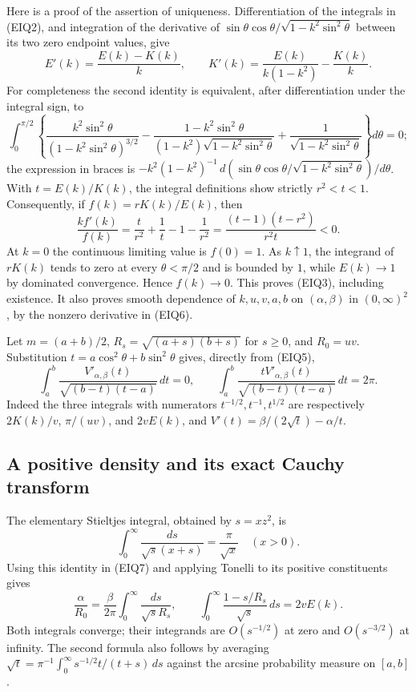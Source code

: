 Here is a proof of the assertion of uniqueness. Differentiation of the
integrals in (EIQ2), and integration of the derivative of
$\sin\theta\cos\theta/\sqrt{1-k^2\sin^2\theta}$ between its two zero
endpoint values, give
\[
 E'(k)=\frac{E(k)-K(k)}{k},\qquad
 K'(k)=\frac{E(k)}{k(1-k^2)}-\frac{K(k)}{k}.
\]
For completeness the second identity is equivalent, after differentiation
under the integral sign, to
\[
 \int_0^{\pi/2}
 \left\{\frac{k^2\sin^2\theta}{(1-k^2\sin^2\theta)^{3/2}}
 -\frac{1-k^2\sin^2\theta}{(1-k^2)\sqrt{1-k^2\sin^2\theta}}
 +\frac1{\sqrt{1-k^2\sin^2\theta}}\right\}d\theta=0;
\]
the expression in braces is
$-k^2(1-k^2)^{-1}\,d(\sin\theta\cos\theta/
\sqrt{1-k^2\sin^2\theta})/d\theta$.
With $t=E(k)/K(k)$, the integral definitions show strictly
$r^2<t<1$.  Consequently, if $f(k)=rK(k)/E(k)$, then
\begin{equation}\tag{EIQ6}
 \frac{kf'(k)}{f(k)}
 =\frac{t}{r^2}+\frac1t-1-\frac1{r^2}
 =\frac{(t-1)(t-r^2)}{r^2t}<0.
\end{equation}
At $k=0$ the continuous limiting value is $f(0)=1$.
As $k\uparrow1$, the integrand of $rK(k)$ tends to zero at every
$\theta<\pi/2$ and is bounded by $1$, while $E(k)\to1$ by dominated
convergence.  Hence $f(k)\to0$.  This proves (EIQ3), including existence.
It also proves smooth dependence of $k,u,v,a,b$ on $(\alpha,\beta)$ in
$(0,\infty)^2$, by the nonzero derivative in (EIQ6).

Let $m=(a+b)/2$, $R_s=\sqrt{(a+s)(b+s)}$ for $s\geq0$, and
$R_0=uv$.  Substitution
$t=a\cos^2\theta+b\sin^2\theta$ gives, directly from (EIQ5),
\begin{equation}\tag{EIQ7}
 \int_a^b\frac{V'_{\alpha,\beta}(t)}
                  {\sqrt{(b-t)(t-a)}}\,dt=0,
 \qquad
 \int_a^b\frac{tV'_{\alpha,\beta}(t)}
                  {\sqrt{(b-t)(t-a)}}\,dt=2\pi.
\end{equation}
Indeed the three integrals with numerators $t^{-1/2},t^{-1},t^{1/2}$
are respectively $2K(k)/v$, $\pi/(uv)$, and $2vE(k)$, and
$V'(t)=\beta/(2\sqrt t)-\alpha/t$.

\subsection{A positive density and its exact Cauchy transform}
The elementary Stieltjes integral, obtained by $s=xz^2$, is
\begin{equation}\tag{EIQ8}
 \int_0^\infty\frac{ds}{\sqrt s(x+s)}=\frac\pi{\sqrt x}
 \quad(x>0).
\end{equation}
Using this identity in (EIQ7) and applying Tonelli to its positive
constituents gives
\begin{equation}\tag{EIQ9}
 \frac\alpha{R_0}=
 \frac\beta{2\pi}\int_0^\infty\frac{ds}{\sqrt s R_s},
 \qquad
 \int_0^\infty\frac{1-s/R_s}{\sqrt s}\,ds=2vE(k).
\end{equation}
Both integrals converge; their integrands are $O(s^{-1/2})$ at zero
and $O(s^{-3/2})$ at infinity.  The second formula also follows by
averaging $\sqrt t=\pi^{-1}\int_0^\infty
s^{-1/2}t/(t+s)\,ds$ against the arcsine probability measure on $[a,b]$.

